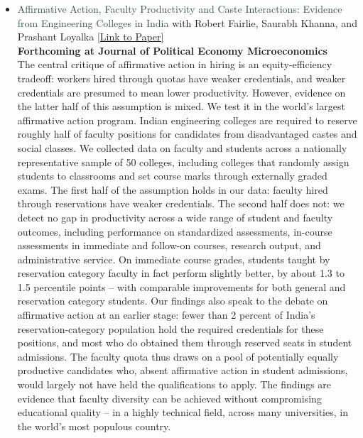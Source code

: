 \documentclass[letter,10pt]{article}
\begin{document}
\begin{itemize}
    \item[] \textcolor{darkslategray}{Affirmative Action, Faculty Productivity and Caste Interactions: Evidence from Engineering Colleges in India} {\small{with Robert Fairlie, Saurabh Khanna, and Prashant Loyalka}} \href{https://www.journals.uchicago.edu/doi/10.1086/743985}{[Link to Paper]} \\
    {\small{\textbf{Forthcoming at Journal of Political Economy Microeconomics}}}\\
    The central critique of affirmative action in hiring is an equity-efficiency tradeoff: workers hired through quotas have weaker credentials, and weaker credentials are presumed to mean lower productivity. However, evidence on the latter half of this assumption is mixed. We test it in the world's largest affirmative action program. Indian engineering colleges are required to reserve roughly half of faculty positions for candidates from disadvantaged castes and social classes. We collected data on faculty and students across a nationally representative sample of 50 colleges, including colleges that randomly assign students to classrooms and set course marks through externally graded exams. The first half of the assumption holds in our data: faculty hired through reservations have weaker credentials. The second half does not: we detect no gap in productivity across a wide range of student and faculty outcomes, including performance on standardized assessments, in-course assessments in immediate and follow-on courses, research output, and administrative service. On immediate course grades, students taught by reservation category faculty in fact perform slightly better, by about 1.3 to 1.5 percentile points -- with comparable improvements for both general and reservation category students. Our findings also speak to the debate on affirmative action at an earlier stage: fewer than 2 percent of India's reservation-category population hold the required credentials for these positions, and most who do obtained them through reserved seats in student admissions. The faculty quota thus draws on a pool of potentially equally productive candidates who, absent affirmative action in student admissions, would largely not have held the qualifications to apply. The findings are evidence that faculty diversity can be achieved without compromising educational quality -- in a highly technical field, across many universities, in the world's most populous country.


\end{itemize}
\end{document}
